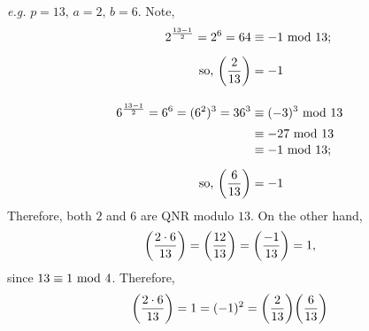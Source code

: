 
\emph{e.g.} $p = 13,\, a = 2,\, b = 6$. Note,
\begin{align*}
2^{\frac{13-1}{2}} = 2^6 = 64 &\equiv -1\text{ mod }{13};\\[0.5em]
\text{so, } \bigg(\dfrac{2}{13}\bigg) &= -1\\[1em]
6^{\frac{13-1}{2}} = 6^6 = (6^2)^3 = 36^3 &\equiv (-3)^3\text{ mod }{13}\\[0.2em]
&\equiv -27\text{ mod }{13}\\[-0.2em]
&\equiv -1\text{ mod }{13};\\[0.5em]
\text{so, } \bigg(\dfrac{6}{13}\bigg) &= -1
\end{align*}
Therefore, both $2$ and $6$ are QNR modulo $13$. On the other hand, 
\[\bigg(\dfrac{2\cdot 6}{13}\bigg) = \bigg(\dfrac{12}{13}\bigg) = \bigg(\dfrac{-1}{13}\bigg) = 1,\]
since $13 \equiv 1 \text{ mod }{4}$. Therefore,
\[\bigg(\dfrac{2\cdot 6}{13}\bigg) = 1 = (-1)^2 = \bigg(\dfrac{2}{13}\bigg)\bigg(\dfrac{6}{13}\bigg)\]

\vspace*{1.5em}

